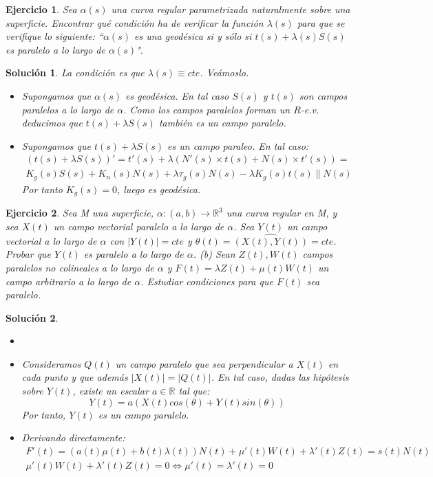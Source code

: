 \documentclass{article}
\theoremstyle{plain}
\newtheorem{exercise}{Ejercicio}
\newtheorem*{sol*}{Solución}
\newcommand{\R}{\mathbb{R}}
\begin{document}
\newpage
\begin{exercise} Sea $\alpha(s)$ una curva regular parametrizada naturalmente sobre una superficie. Encontrar qué condición ha de verificar la función $\lambda(s)$ para que se verifique lo siguiente: ``$\alpha(s)$ es una geodésica si y sólo si $t(s) + \lambda(s)S(s)$ es paralelo a lo largo de $\alpha(s)$".
\end{exercise}
\begin{sol*}
La condición es que $\lambda(s)\equiv cte$. Veámoslo.
\begin{itemize}
\item Supongamos que $\alpha(s)$ es geodésica. En tal caso $S(s)$ y $t(s)$ son campos paralelos a lo largo de $\alpha$. Como los campos paralelos forman un $R$-e.v. deducimos que $t(s)+\lambda S(s)$ también es un campo paralelo.
\item Supongamos que $t(s)+\lambda S(s)$ es un campo paraleo. En tal caso:
\begin{gather*}
(t(s)+\lambda S(s))' = t'(s) + \lambda(N'(s)\times t(s) + N(s)\times t'(s))= \\
K_g(s) S(s) + K_n(s)N(s)+ \lambda \tau_g(s) N(s) - \lambda K_g(s)t(s) \parallel N(s)
\end{gather*}
Por tanto $K_g(s) = 0$, luego es geodésica.
\end{itemize}
\end{sol*}

\newpage
\begin{exercise}
Sea M una superficie, $\alpha:(a,b)\rightarrow \R^3$ una curva regular en M, y sea $X(t)$ un campo vectorial paralelo a lo largo de $\alpha$. Sea $Y(t)$ un campo vectorial a lo largo de $\alpha$ con $|Y(t)|=cte$ y $\theta(t)=\widehat{(X(t),Y(t))} = cte$. Probar que $Y(t)$ es paralelo a lo largo de $\alpha$. (b) Sean $Z(t),W(t)$ campos paralelos no colineales a lo largo de $\alpha$ y $F(t)=\lambda Z(t)+\mu(t) W(t)$ un campo arbitrario a lo largo de $\alpha$. Estudiar condiciones para que $F(t)$ sea paralelo.
\end{exercise}
\begin{sol*}
\begin{itemize}
\item[]
\item Consideramos $Q(t)$ un campo paralelo que sea perpendicular a $X(t)$ en cada punto y que además $|X(t)|=|Q(t)|$. En tal caso, dadas las hipótesis sobre $Y(t)$, existe un escalar $a\in\R$ tal que:
\[
Y(t) = a(X(t)cos(\theta) + Y(t)sin(\theta))
\]
Por tanto, $Y(t)$ es un campo paralelo.
\item Derivando directamente:
\begin{gather*}
F'(t) = (a(t)\mu(t)+b(t)\lambda(t))N(t) + \mu'(t)W(t)+\lambda'(t)Z(t) = s(t)N(t)\\
 \mu'(t)W(t)+\lambda'(t)Z(t) = 0 \Leftrightarrow \mu'(t)=\lambda'(t)=0
\end{gather*}
\end{itemize}
\end{sol*}
\end{document}
